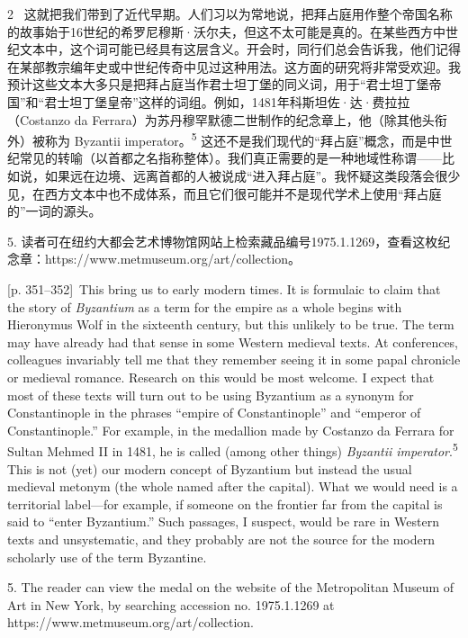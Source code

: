\documentclass[10pt,a4paper]{article}
\begin{document}
\begin{paracol}{2}
\switchcolumn*
{\scriptsize\color{gray}[p. 351–352]}\ 这就把我们带到了近代早期。人们习以为常地说，把拜占庭用作整个帝国名称的故事始于16世纪的希罗尼穆斯·沃尔夫，但这不太可能是真的。在某些西方中世纪文本中，这个词可能已经具有这层含义。开会时，同行们总会告诉我，他们记得在某部教宗编年史或中世纪传奇中见过这种用法。这方面的研究将非常受欢迎。我预计这些文本大多只是把拜占庭当作君士坦丁堡的同义词，用于“君士坦丁堡帝国”和“君士坦丁堡皇帝”这样的词组。例如，1481年科斯坦佐·达·费拉拉（Costanzo da Ferrara）为苏丹穆罕默德二世制作的纪念章上，他（除其他头衔外）被称为 Byzantii imperator。\nobreak\textsuperscript{5} 这还不是我们现代的“拜占庭”概念，而是中世纪常见的转喻（以首都之名指称整体）。我们真正需要的是一种地域性称谓——比如说，如果远在边境、远离首都的人被说成“进入拜占庭”。我怀疑这类段落会很少见，在西方文本中也不成体系，而且它们很可能并不是现代学术上使用“拜占庭的”一词的源头。\par{\small 5. 读者可在纽约大都会艺术博物馆网站上检索藏品编号1975.1.1269，查看这枚纪念章：https://www.metmuseum.org/art/collection。\par}
\switchcolumn
{\scriptsize\color{gray}[p. 351–352]}\ This bring us to early modern times. It is formulaic to claim that the story of \textit{Byzantium} as a term for the empire as a whole begins with Hieronymus Wolf in the sixteenth century, but this unlikely to be true. The term may have already had that sense in some Western medieval texts. At conferences, colleagues invariably tell me that they remember seeing it in some papal chronicle or medieval romance. Research on this would be most welcome. I expect that most of these texts will turn out to be using Byzantium as a synonym for Constantinople in the phrases “empire of Constantinople” and “emperor of Constantinople.” For example, in the medallion made by Costanzo da Ferrara for Sultan Mehmed II in 1481, he is called (among other things) \textit{Byzantii imperator}.\nobreak\textsuperscript{5} This is not (yet) our modern concept of Byzantium but instead the usual medieval metonym (the whole named after the capital). What we would need is a territorial label—for example, if someone on the frontier far from the capital is said to “enter Byzantium.” Such passages, I suspect, would be rare in Western texts and unsystematic, and they probably are not the source for the modern scholarly use of the term Byzantine.\par{\small 5.  The reader can view the medal on the website of the Metropolitan Museum of Art in New York, by searching accession no. 1975.1.1269 at https://www.metmuseum.org/art/collection.\par}

\end{paracol}
\end{document}
